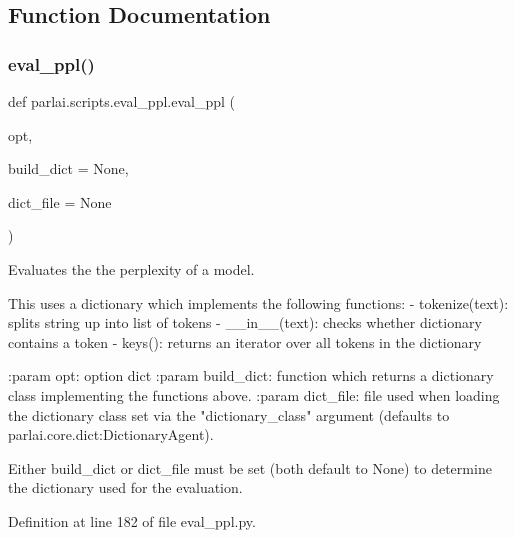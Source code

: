 \subsection{Function Documentation}
\mbox{\label{namespaceparlai_1_1scripts_1_1eval__ppl_ad1a8a8891f276136e82edc906ea58340}} 
\subsubsection{\texorpdfstring{eval\+\_\+ppl()}{eval\_ppl()}}
{\footnotesize\ttfamily def parlai.\+scripts.\+eval\+\_\+ppl.\+eval\+\_\+ppl (\begin{DoxyParamCaption}\item[{}]{opt,  }\item[{}]{build\+\_\+dict = {\ttfamily None},  }\item[{}]{dict\+\_\+file = {\ttfamily None} }\end{DoxyParamCaption})}

\begin{DoxyVerb}Evaluates the the perplexity of a model.

This uses a dictionary which implements the following functions:
- tokenize(text): splits string up into list of tokens
- __in__(text): checks whether dictionary contains a token
- keys(): returns an iterator over all tokens in the dictionary

:param opt: option dict
:param build_dict: function which returns a dictionary class implementing
    the functions above.
:param dict_file: file used when loading the dictionary class set via the
    "dictionary_class" argument (defaults to
    parlai.core.dict:DictionaryAgent).

Either build_dict or dict_file must be set (both default to None) to
determine the dictionary used for the evaluation.
\end{DoxyVerb}
 

Definition at line 182 of file eval\+\_\+ppl.\+py.


